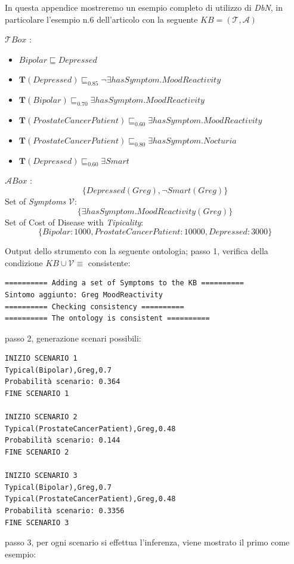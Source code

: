 In questa appendice mostreremo un esempio completo di utilizzo di \textit{DbN}, in particolare
l'esempio n.6 dell'articolo  \cite{ProbOfEx} con la seguente 
$ KB = (\mathcal{T},\mathcal{A}) $

$ \mathcal{T}Box $ :
\begin{itemize}
	\item[] $ Bipolar \sqsubseteq Depressed $
	\item[] $ \mathbf T(Depressed) \sqsubseteq_{0.85} \neg\exists hasSymptom.MoodReactivity $
	\item[] $ \mathbf T(Bipolar) \sqsubseteq_{0.70} \exists hasSymptom.MoodReactivity $
	\item[] $ \mathbf T(ProstateCancerPatient) \sqsubseteq_{0.60} \exists hasSymptom.MoodReactivity $
	\item[] $ \mathbf T(ProstateCancerPatient) \sqsubseteq_{0.80} \exists hasSymptom.Nocturia $
	\item[] $ \mathbf T(Depressed) \sqsubseteq_{0.60} \exists Smart $
\end{itemize}
$\mathcal{A}Box $ :
\[ \{ Depressed(Greg), \neg Smart(Greg) \} \]
Set of \textit{Symptoms} $\mathcal{V} $:
\[ \{ \exists hasSymptom.MoodReactivity(Greg) \} \]
Set of Cost of Disease with \textit{Tipicality}:
\[ \{ Bipolar: 1000, ProstateCancerPatient: 10000, Depressed: 3000 \} \]

Output dello strumento con la seguente ontologia; passo 1, 
verifica della condizione $ KB \cup \mathcal{V} \equiv $ consistente:
\begin{verbatim}
========== Adding a set of Symptoms to the KB ==========
Sintomo aggiunto: Greg MoodReactivity
========== Checking consistency ==========
========== The ontology is consistent ==========
\end{verbatim}
passo 2, generazione scenari possibili:
\begin{verbatim}
INIZIO SCENARIO 1
Typical(Bipolar),Greg,0.7
Probabilità scenario: 0.364
FINE SCENARIO 1

INIZIO SCENARIO 2
Typical(ProstateCancerPatient),Greg,0.48
Probabilità scenario: 0.144
FINE SCENARIO 2

INIZIO SCENARIO 3
Typical(Bipolar),Greg,0.7
Typical(ProstateCancerPatient),Greg,0.48
Probabilità scenario: 0.3356
FINE SCENARIO 3
\end{verbatim}
passo 3, per ogni scenario si effettua l'inferenza, viene mostrato il primo come esempio:

